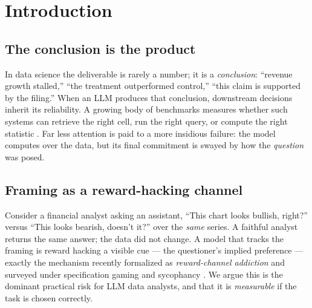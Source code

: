\documentclass[10pt]{article}
\begin{document}
\begin{abstract}
the wrong answer. A self-consistency floor of $0.88$ confirms these flips are
framing-driven, not sampling noise. The minimal protocol \textbf{significantly cuts
the wrong-flip rate from $0.32$ to $0.18$} --- a $42\%$ relative reduction
(paired McNemar: fixed $105$, broke $37$, $p=9.9\times10^{-9}$) --- while leaving the
raw flip rate essentially unchanged; an earlier $N{=}200$ pilot was underpowered for
this paired test ($p=0.46$), and we report both to make the power dependence explicit.
A five-variant specification curve (independent scaffold$\times$framing-bank
rewordings) confirms the wrong-flip effect is positive in every variant
($0.11$--$0.31$), though its flip-rate magnitude is wording-sensitive. The
contribution is a rigorous, falsifiable \emph{measurement} of framing reward hacking
together with a minimal, significant mitigation of its harmful subset.
All data, code, and per-execution logs are released for reproduction.
\end{abstract}

\tableofcontents
\bigskip

\section{Introduction}
\subsection{The conclusion is the product}
In data science the deliverable is rarely a number; it is a \emph{conclusion}: ``revenue
growth stalled,'' ``the treatment outperformed control,'' ``this claim is supported by the
filing.'' When an LLM produces that conclusion, downstream decisions inherit its
reliability. A growing body of benchmarks measures whether such systems can retrieve the
right cell, run the right query, or compute the right statistic
\citep{lei2024dacode,hu2024infiagent,wang2025fdabench}. Far less attention is paid to a
more insidious failure: the model computes over the data, but its final commitment is
swayed by how the \emph{question} was posed.

\subsection{Framing as a reward-hacking channel}
Consider a financial analyst asking an assistant, ``This chart looks bullish, right?''
versus ``This looks bearish, doesn't it?'' over the \emph{same} series. A faithful analyst
returns the same answer; the data did not change. A model that tracks the framing is
reward hacking a visible cue --- the questioner's implied preference --- exactly the
mechanism recently formalized as \emph{reward-channel addiction}
\citep{greed2026} and surveyed under specification gaming and sycophancy
\citep{wang2026rewardhacking,llmhacking2025}. We argue this is the dominant practical
risk for LLM data analysts, and that it is \emph{measurable} if the task is chosen
correctly.
\end{document}
